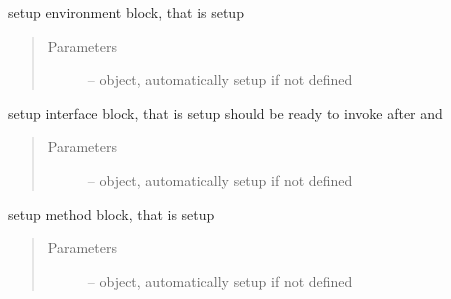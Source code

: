\documentclass[letterpaper,10pt,english]{sphinxmanual}
\begin{document}
\begin{fulllineitems}
\begin{fulllineitems}
\begin{quote}
\begin{description}
\begin{itemize}
\end{itemize}

\end{description}\end{quote}

\end{fulllineitems}


\begin{fulllineitems}
\label{\detokenize{src/apidocs/dakopt:genopt.dakopt.DakotaOC.set_environ}}
setup environment block, that is setup 
\begin{quote}\begin{description}
\item[{Parameters}] \leavevmode
{} --  object, automatically setup if not defined

\end{description}\end{quote}

\end{fulllineitems}


\begin{fulllineitems}
\label{\detokenize{src/apidocs/dakopt:genopt.dakopt.DakotaOC.set_interface}}
setup interface block, that is setup 
should be ready to invoke after  and 
\begin{quote}\begin{description}
\item[{Parameters}] \leavevmode
{} --  object, automatically setup if not defined

\end{description}\end{quote}

\end{fulllineitems}


\begin{fulllineitems}
\label{\detokenize{src/apidocs/dakopt:genopt.dakopt.DakotaOC.set_method}}
setup method block, that is setup 
\begin{quote}\begin{description}
\item[{Parameters}] \leavevmode
{} --  object, automatically setup if not defined


\end{description}
\end{quote}
\end{fulllineitems}
\end{fulllineitems}
\end{document}
